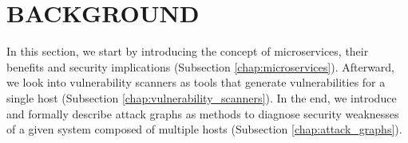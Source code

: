 \section{BACKGROUND}

In this section, we start by introducing the concept of microservices, their benefits and security implications (Subsection \ref{chap:microservices}). Afterward, we look into vulnerability scanners as tools that generate vulnerabilities for a single host (Subsection \ref{chap:vulnerability_scanners}). In the end, we introduce and formally describe attack graphs as methods to diagnose security weaknesses of a given system composed of multiple hosts (Subsection \ref{chap:attack_graphs}).





